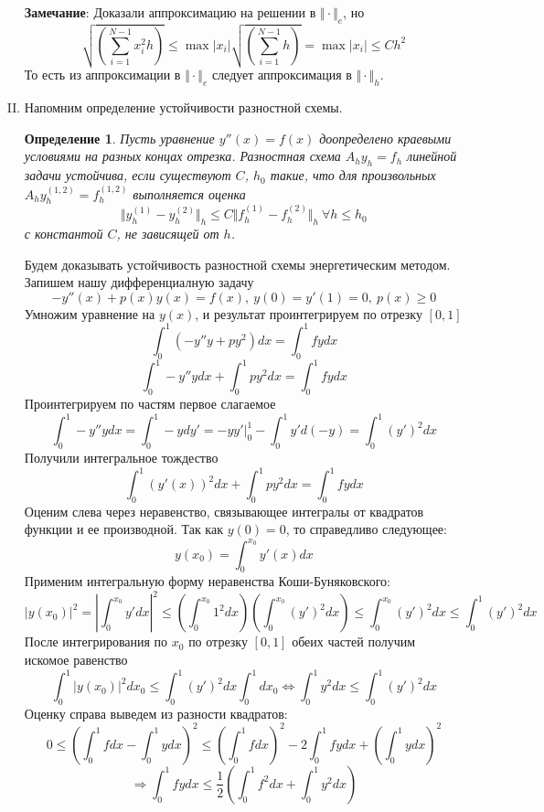 \documentclass[12pt]{article}
\newtheorem*{definition}{Определение}
\begin{document}
\begin{enumerate}[I.]
	      \textbf{Замечание}: Доказали аппроксимацию на решении в $\Vert\cdot\Vert_e$, но
	      \[\sqrt{\left(\sum_{i=1}^{N-1}x_i^2h\right)}\leq\max|x_i|\sqrt{\left(\sum_{i=1}^{N-1}h\right)}=\max|x_i|\leq C h^2\]
	      То есть из аппроксимации в $\Vert\cdot\Vert_e$ следует аппроксимация в $\Vert\cdot\Vert_h$.

	      \newpage

	\item Напомним определение устойчивости разностной схемы.
	      \begin{definition}
		      Пусть уравнение $y''(x)=f(x)$ доопределено краевыми
		      условиями на разных концах отрезка. Разностная схема
		      $A_hy_h = f_h$ линейной задачи устойчива, если существуют $C$, $h_0$ такие, что для
		      произвольных $A_hy^{(1,2)}_h = f^{(1,2)}_h$ выполняется оценка
		      \[\Vert y^{(1)}_h-y^{(2)}_h\Vert_h\leq C\Vert f^{(1)}_h -f^{(2)}_h\Vert_h\ \forall h\leq h_0\]
		      с константой $C$, не зависящей от $h$.
	      \end{definition}

	      Будем доказывать устойчивость разностной схемы энергетическим методом.
	      Запишем нашу дифференциалную задачу
	      \[-y''(x)+p(x)y(x)=f(x),\ y(0) = y'(1) = 0,\ p(x)\geq 0\]
	      Умножим уравнение на $y(x)$, и результат проинтегрируем по отрезку $[0, 1]$
	      \[\int_0^1 (-y''y+py^2)dx = \int_0^1fydx \]
	      \[\int_0^1 -y''ydx+ \int_0^1py^2 dx = \int_0^1fydx \]
	      Проинтегрируем по частям первое слагаемое
	      \[\int_0^1 -y''ydx = \int_0^1-ydy' = -yy'\vert^1_0 - \int_0^1y'd(-y) = \int_0^1(y')^2dx\]
	      Получили интегральное тождество
	      \[\int_0^1 (y'(x))^2dx+ \int_0^1py^2 dx = \int_0^1fydx \]
	      Оценим слева через неравенство, связывающее интегралы от квадратов
	      функции и ее производной. Так как $y(0) = 0$, то справедливо следующее:
	      \[y(x_0) = \int_0^{x_0}y'(x)dx\]
	      Применим интегральную форму неравенства Коши-Буняковского:
	      \[|y(x_0)|^2 = \left|\int_0^{x_0}y'dx\right|^2\leq\left(\int_0^{x_0}1^2dx\right)\left(\int_0^{x_0}(y')^2dx\right)\leq\int_0^{x_0}(y')^2dx\leq\int_0^{1}(y')^2dx\]
	      После интегрирования по $x_0$ по отрезку $[0,1]$ обеих частей получим искомое равенство
	      \[\int_0^1|y(x_0)|^2dx_0 \leq \int_0^{1}(y')^2dx\int_0^1dx_0 \Leftrightarrow \int_0^1y^2dx\leq\int_0^1(y')^2dx\]
	      Оценку справа выведем из разности квадратов:
	      \[0\leq\left(\int_0^1fdx-\int_0^1ydx\right)^2\leq\left(\int_0^1fdx\right)^2-2\int_0^1fydx+\left(\int_0^1ydx\right)^2\]
	      \[\Rightarrow\int_0^1fydx\leq\frac{1}{2}\left(\int_0^1f^2dx + \int_0^1y^2dx\right)\]


\end{enumerate}
\end{document}
